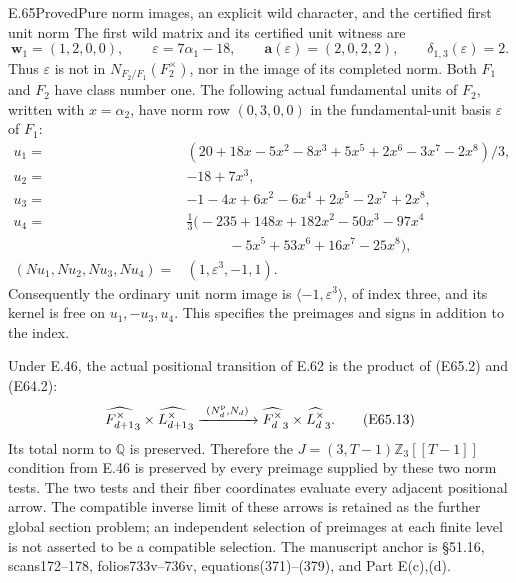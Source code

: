 \begin{statement}{E.65}{Proved}{Pure norm images, an explicit wild character, and the certified first unit norm}
The first wild matrix and its certified unit witness are
\[
 \mathbf w_1=(1,2,0,0),\qquad
 \varepsilon=7\alpha_1-18,
 \qquad\mathbf a(\varepsilon)=(2,0,2,2),
 \qquad\delta_{1,3}(\varepsilon)=2.
 \tag{E65.11}
\]
Thus $\varepsilon$ is not in
$N_{F_2/F_1}(F_2^\times)$, nor in the image of its completed norm.
Both $F_1$ and $F_2$ have class number one.
The following actual fundamental units of $F_2$, written with
$x=\alpha_2$, have norm row $(0,3,0,0)$ in the fundamental-unit
basis $\varepsilon$ of $F_1$:
\[
\begin{aligned}
 u_1={}&(20+18x-5x^2-8x^3+5x^5+2x^6-3x^7-2x^8)/3,\\
 u_2={}&-18+7x^3,\\
 u_3={}&-1-4x+6x^2-6x^4+2x^5-2x^7+2x^8,\\
 u_4={}&\tfrac13\bigl(-235+148x+182x^2-50x^3-97x^4\\
       &\hspace{3em}{}-5x^5+53x^6+16x^7-25x^8\bigr),\\
 (Nu_1,Nu_2,Nu_3,Nu_4)={}&(1,\varepsilon^3,-1,1).
\end{aligned}
 \tag{E65.12}
\]
Consequently the ordinary unit norm image is
$\langle-1,\varepsilon^3\rangle$, of index three, and its kernel is
free on $u_1,-u_3,u_4$. This specifies the preimages and signs in
addition to the index.

Under E.46, the actual positional transition of E.62 is the product
of (E65.2) and (E64.2):
\[
 \widehat{F_{d+1}^\times}_3\times
       \widehat{L_{d+1}^\times}_3
  \xrightarrow{\ (N_d^{\rm p},N_d)\ }
 \widehat{F_d^\times}_3\times\widehat{L_d^\times}_3.
 \tag{E65.13}
\]
Its total norm to $\mathbb Q$ is preserved. Therefore the
$J=(3,T-1)\mathbb Z_3[[T-1]]$ condition from E.46 is preserved by
every preimage supplied by these two norm tests.
The two tests and their fiber coordinates evaluate every adjacent
positional arrow. The compatible inverse limit of these arrows is
retained as the further global section problem; an independent
selection of preimages at each finite level is not asserted to be a
compatible selection.
The manuscript anchor is \S51.16, scans172--178,
folios733v--736v, equations(371)--(379), and Part E(c),(d).
\end{statement}

